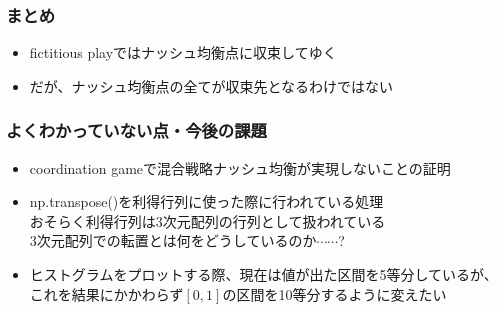 \documentclass[dvipdfmx,fleqn,handout]{beamer}
\begin{document}
\begin{frame}
\frametitle{まとめ}
\begin{itemize}\setlength{\parskip}{0.5em}
\item
fictitious playではナッシュ均衡点に収束してゆく\pause
\item
だが、ナッシュ均衡点の全てが収束先となるわけではない
\end{itemize}
\end{frame}

\begin{frame}
\frametitle{よくわかっていない点・今後の課題}
\begin{itemize}\setlength{\parskip}{0.5em}
\item
coordination gameで混合戦略ナッシュ均衡が実現しないことの証明\pause
\item
np.transpose()を利得行列に使った際に行われている処理\pause\\
おそらく利得行列は3次元配列の行列として扱われている\\
3次元配列での転置とは何をどうしているのか$\cdots\cdots$?
\item
ヒストグラムをプロットする際、現在は値が出た区間を5等分しているが、これを結果にかかわらず$[0,1]$の区間を10等分するように変えたい

\end{itemize}
\end{frame}
\end{document}
